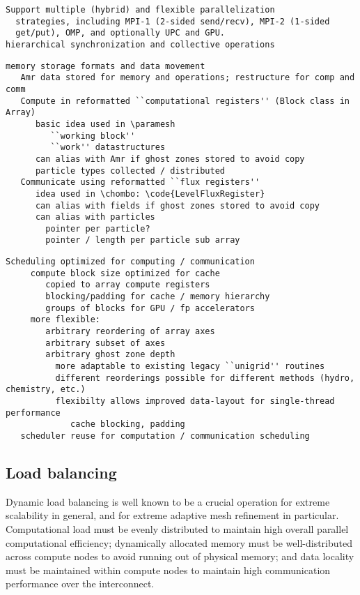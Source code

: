 \documentclass[10pt]{article}
\begin{document}
\begin{verbatim}
Support multiple (hybrid) and flexible parallelization
  strategies, including MPI-1 (2-sided send/recv), MPI-2 (1-sided
  get/put), OMP, and optionally UPC and GPU.
hierarchical synchronization and collective operations
\end{verbatim}

\begin{verbatim}
memory storage formats and data movement
   Amr data stored for memory and operations; restructure for comp and comm
   Compute in reformatted ``computational registers'' (Block class in Array)
      basic idea used in \paramesh
         ``working block'' 
         ``work'' datastructures
      can alias with Amr if ghost zones stored to avoid copy
      particle types collected / distributed
   Communicate using reformatted ``flux registers''
      idea used in \chombo: \code{LevelFluxRegister}
      can alias with fields if ghost zones stored to avoid copy
      can alias with particles 
        pointer per particle?  
        pointer / length per particle sub array
\end{verbatim}
 
\begin{verbatim}
Scheduling optimized for computing / communication
     compute block size optimized for cache
        copied to array compute registers
        blocking/padding for cache / memory hierarchy
        groups of blocks for GPU / fp accelerators
     more flexible:
        arbitrary reordering of array axes
        arbitrary subset of axes
        arbitrary ghost zone depth
          more adaptable to existing legacy ``unigrid'' routines
          different reorderings possible for different methods (hydro, chemistry, etc.)
          flexibilty allows improved data-layout for single-thread performance
             cache blocking, padding
   scheduler reuse for computation / communication scheduling
\end{verbatim}

\subsection{Load balancing} \label{ss:design-balance}

Dynamic load balancing is well known to be a crucial operation for
extreme scalability in general, and for extreme adaptive mesh
refinement in particular.  Computational load must be evenly
distributed to maintain high overall parallel computational
efficiency; dynamically allocated memory must be well-distributed
across compute nodes to avoid running out of physical memory; and data
locality must be maintained within compute nodes to maintain high
communication performance over the interconnect.
\end{document}
